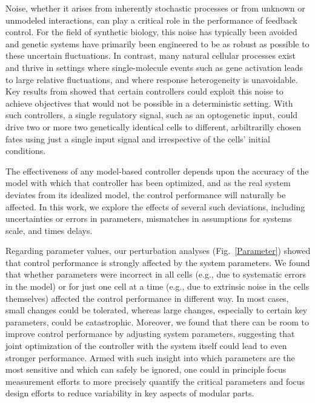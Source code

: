 \documentclass[12pt]{iopart}
\begin{document}
Noise, whether it arises from inherently stochastic processes or from unknown or unmodeled interactions, can play a critical role in the performance of feedback control. For the field of synthetic biology, this noise has typically been avoided and genetic systems have primarily been engineered to be as robust as possible to these uncertain fluctuations. In contrast, many natural cellular processes exist and thrive in settings where single-molecule events such as gene activation leads to large relative fluctuations, and where response heterogeneity is unavoidable. Key results from \cite{May2021} showed that certain controllers could exploit this noise to achieve objectives that would not be possible in a deterministic setting. With such controllers, a single regulatory signal, such as an optogenetic input, could drive two or more two genetically identical cells to different, arbiltrarilly chosen fates using just a single input signal and irrespective of the cells' initial conditions. 

The effectiveness of any model-based controller depends upon the accuracy of the model with which that controller has been optimized, and as the real system deviates from its idealized model, the control performance will naturally be affected. In this work, we explore the effects of several such deviations, including uncertainties or errors in parameters, mismatches in assumptions for systems scale, and times delays. 

Regarding parameter values, our perturbation analyses (Fig.\ \ref{Parameter}) showed that control performance is strongly affected by the system parameters. 
We found that whether parameters were incorrect in all cells (e.g., due to systematic errors in the model) or for just one cell at a time (e.g., due to extrinsic noise in the cells themselves) affected the control performance in different way. 
In most cases, small changes could be tolerated, whereas large changes, especially to certain key parameters, could be catastrophic. 
Moreover, we found that there can be room to improve control performance by adjusting system parameters, suggesting that joint optimization of the controller with the system itself could lead to even stronger performance.
Armed with such insight into which parameters are the most sensitive and which can safely be ignored, one could in principle focus measurement efforts to more precisely quantify the critical parameters and focus design efforts to reduce variability in key aspects of modular parts.
\end{document}
